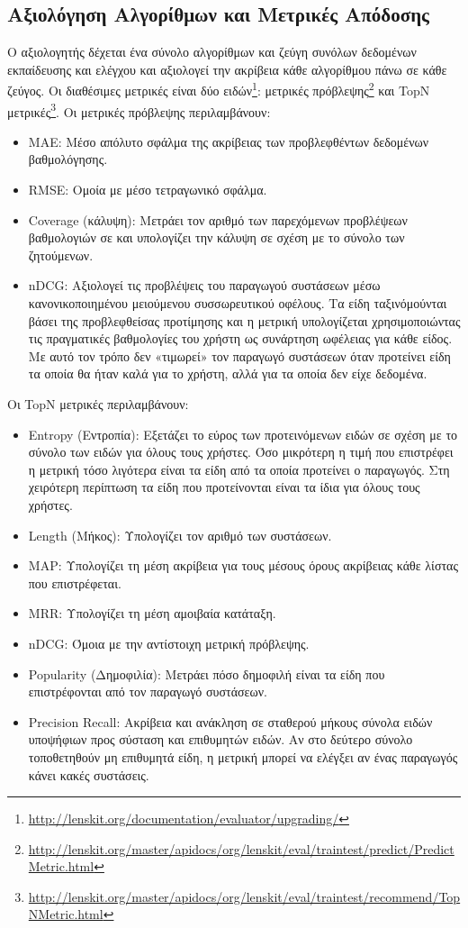 \subsection{Aξιολόγηση Αλγορίθμων και Mετρικές Απόδοσης}
Ο αξιολογητής δέχεται ένα σύνολο αλγορίθμων και ζεύγη συνόλων δεδομένων εκπαίδευσης και ελέγχου και αξιολογεί την ακρίβεια κάθε αλγορίθμου πάνω σε κάθε ζεύγος. Οι διαθέσιμες μετρικές είναι δύο ειδών\footnote{\en \url{http://lenskit.org/documentation/evaluator/upgrading/}}: μετρικές πρόβλεψης\footnote{\en \url{http://lenskit.org/master/apidocs/org/lenskit/eval/traintest/predict/PredictMetric.html}} και {\en TopN} μετρικές\footnote{\en \url{http://lenskit.org/master/apidocs/org/lenskit/eval/traintest/recommend/TopNMetric.html}}. Οι μετρικές πρόβλεψης περιλαμβάνουν: 
\begin{itemize}
\item {\en MAE}: Μέσο απόλυτο σφάλμα της ακρίβειας των προβλεφθέντων δεδομένων βαθμολόγησης. 
\item {\en RMSE}: Ομοία με μέσο τετραγωνικό σφάλμα. 
\item {\en Coverage \el(κάλυψη)}: Μετράει τον αριθμό των παρεχόμενων προβλέψεων βαθμολογιών σε και υπολογίζει την κάλυψη σε σχέση με το σύνολο των ζητού\-μενων.
\item {\en nDCG}: Αξιολογεί τις προβλέψεις του παραγωγού συστάσεων μέσω κανονικοποιημένου μειούμενου συσσωρευτικού οφέλους. Τα είδη ταξινόμούνται βάσει της προβλεφθείσας προτίμησης και η μετρική υπολογίζεται χρησιμοποιώντας τις πραγματικές βαθμολογίες του χρήστη ως συνάρτηση ωφέλειας για κάθε είδος. Με αυτό τον τρόπο δεν «τιμωρεί» τον παραγωγό συστάσεων όταν προτείνει είδη τα οποία θα ήταν καλά για το χρήστη, αλλά για τα οποία δεν είχε δεδομένα.
\end{itemize}
Οι {\en TopN} μετρικές περιλαμβάνουν:
\begin{itemize}
 \item {\en Entropy} (Εντροπία): Εξετάζει το εύρος των προτεινόμενων ειδών σε σχέση με το σύνολο των ειδών για όλους τους χρήστες. Όσο μικρότερη η τιμή που επιστρέφει η μετρική τόσο λιγότερα είναι τα είδη από τα οποία προτείνει ο παραγωγός. Στη χειρότερη περίπτωση τα είδη που προτείνονται είναι τα ίδια για όλους τους χρήστες.
 \item {\en Length} (Μήκος): Υπολογίζει τον αριθμό των συστάσεων. 
 \item {\en MAP}: Υπολογίζει τη μέση ακρίβεια για τους μέσους όρους ακρίβειας κάθε λίστας που επιστρέφεται.
 \item {\en MRR}: Υπολογίζει τη μέση αμοιβαία κατάταξη. 
 \item {\en nDCG}: Όμοια με την αντίστοιχη μετρική πρόβλεψης.
 \item {\en Popularity \el(Δημοφιλία)}: Μετράει πόσο δημοφιλή είναι τα είδη που επιστρέφονται από τον παραγωγό συστάσεων.
 \item {\en Precision Recall:} \el Ακρίβεια και ανάκληση σε σταθερού μήκους σύνολα ειδών υποψήφιων προς σύσταση και επιθυμητών ειδών. Αν στο δεύτερο σύνολο τοποθετηθούν μη επιθυμητά είδη, η μετρική μπορεί να ελέγξει αν ένας παραγωγός κάνει κακές συστάσεις. 
\end{itemize}
